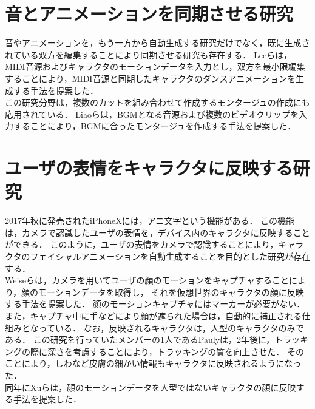 \section{音とアニメーションを同期させる研究} \label{sec:synchronization}
音やアニメーションを，もう一方から自動生成する研究だけでなく，既に生成されている双方を編集することにより同期させる研究も存在する．
Leeら\cite{Lee}は，MIDI音源およびキャラクタのモーションデータを入力とし，双方を最小限編集することにより，MIDI音源と同期したキャラクタのダンスアニメーションを生成する手法を提案した．\\
\indent
この研究分野は，複数のカットを組み合わせて作成するモンタージュの作成にも応用されている．
Liaoら\cite{Liao}は，BGMとなる音源および複数のビデオクリップを入力することにより，BGMに合ったモンタージュを作成する手法を提案した．

\section{ユーザの表情をキャラクタに反映する研究} \label{sec:animoji}
2017年秋に発売されたiPhoneXには，アニ文字という機能がある．
この機能は，カメラで認識したユーザの表情を，デバイス内のキャラクタに反映することができる．
このように，ユーザの表情をカメラで認識することにより，キャラクタのフェイシャルアニメーションを自動生成することを目的とした研究が存在する．\\
\indent
Weiseら\cite{Weise}は，カメラを用いてユーザの顔のモーションをキャプチャすることにより，顔のモーションデータを取得し，
それを仮想世界のキャラクタの顔に反映する手法を提案した．
顔のモーションキャプチャにはマーカーが必要がない．
また，キャプチャ中に手などにより顔が遮られた場合は，自動的に補正される仕組みとなっている．
なお，反映されるキャラクタは，人型のキャラクタのみである．
この研究を行っていたメンバーの1人であるPauly\cite{Pauly}は，2年後に，トラッキングの際に深さを考慮することにより，トラッキングの質を向上させた．
そのことにより，しわなど皮膚の細かい情報もキャラクタに反映されるようになった．\\
\indent
同年にXuら\cite{Xu}は，顔のモーションデータを人型ではないキャラクタの顔に反映する手法を提案した．

